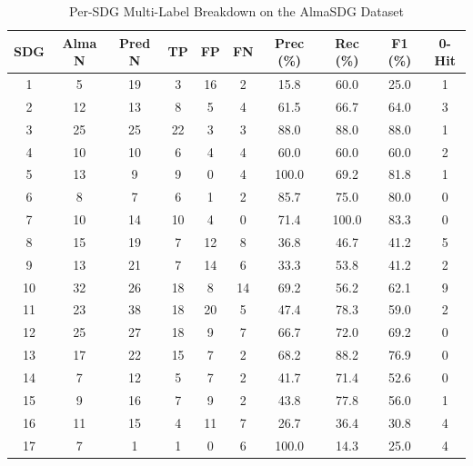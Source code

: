 \begin{table}[!ht]
  \centering
  \caption{Per-SDG Multi-Label Breakdown on the AlmaSDG Dataset}
  \label{tab:almasdg_per_sdg}
  \begin{tabular}{
    S[table-format=2.0]
    S[table-format=2.0]
    S[table-format=2.0]
    S[table-format=2.0]
    S[table-format=2.0]
    S[table-format=2.0]
    S[table-format=3.1]
    S[table-format=3.1]
    S[table-format=3.1]
    S[table-format=1.0]
  }
    \toprule
    {\textbf{SDG}} & {\textbf{Alma N}} & {\textbf{Pred N}} & {\textbf{TP}} & {\textbf{FP}} & {\textbf{FN}} & {\textbf{Prec (\unit{\percent})}} & {\textbf{Rec (\unit{\percent})}} & {\textbf{F1 (\unit{\percent})}} & {\textbf{0-Hit}} \\
     &  5 & 19 &  3 & 16 &  2 &  15.8 &  60.0 & 25.0 & 1 \\
     2 & 12 & 13 &  8 &  5 &  4 &  61.5 &  66.7 & 64.0 & 3 \\
     3 & 25 & 25 & 22 &  3 &  3 &  88.0 &  88.0 & 88.0 & 1 \\
     4 & 10 & 10 &  6 &  4 &  4 &  60.0 &  60.0 & 60.0 & 2 \\
     5 & 13 &  9 &  9 &  0 &  4 & 100.0 &  69.2 & 81.8 & 1 \\
     6 &  8 &  7 &  6 &  1 &  2 &  85.7 &  75.0 & 80.0 & 0 \\
     7 & 10 & 14 & 10 &  4 &  0 &  71.4 & 100.0 & 83.3 & 0 \\
     8 & 15 & 19 &  7 & 12 &  8 &  36.8 &  46.7 & 41.2 & 5 \\
     9 & 13 & 21 &  7 & 14 &  6 &  33.3 &  53.8 & 41.2 & 2 \\
    10 & 32 & 26 & 18 &  8 & 14 &  69.2 &  56.2 & 62.1 & 9 \\
    11 & 23 & 38 & 18 & 20 &  5 &  47.4 &  78.3 & 59.0 & 2 \\
    12 & 25 & 27 & 18 &  9 &  7 &  66.7 &  72.0 & 69.2 & 0 \\
    13 & 17 & 22 & 15 &  7 &  2 &  68.2 &  88.2 & 76.9 & 0 \\
    14 &  7 & 12 &  5 &  7 &  2 &  41.7 &  71.4 & 52.6 & 0 \\
    15 &  9 & 16 &  7 &  9 &  2 &  43.8 &  77.8 & 56.0 & 1 \\
    16 & 11 & 15 &  4 & 11 &  7 &  26.7 &  36.4 & 30.8 & 4 \\
    17 &  7 &  1 &  1 &  0 &  6 & 100.0 &  14.3 & 25.0 & 4 \\
    \bottomrule
  \end{tabular}
\end{table}

